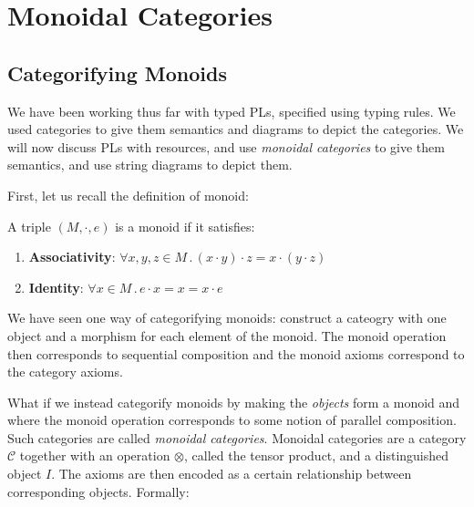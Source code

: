 \chapter{Monoidal Categories}
\section{Categorifying Monoids}

We have been working thus far with typed PLs, specified using 
typing rules. We used categories to give them semantics and 
diagrams to depict the categories. We will now discuss PLs 
with resources, and use \emph{monoidal categories} to give 
them semantics, and use string diagrams to depict them.

First, let us recall the definition of monoid:


\begin{definition}[monoid]
    A triple $(M, \cdot, e)$ is a monoid if it satisfies:
    \begin{enumerate}
        \item \textbf{Associativity}: $\forall x, y, z \in M
            \,.\, (x \cdot y) \cdot z = x \cdot (y \cdot z)$
        \item \textbf{Identity}: $\forall x \in M \,.\,
            e \cdot x = x = x \cdot e$
    \end{enumerate}
\end{definition}

We have seen one way of categorifying monoids: construct a cateogry 
with one object and a morphism for each element of the monoid.
The monoid operation then corresponds to sequential composition 
and the monoid axioms correspond to the category axioms.

What if we instead categorify monoids by making the \emph{objects} form
a monoid and where the monoid operation corresponds to some notion
of parallel composition. Such categories are called 
\emph{monoidal categories}.
Monoidal categories are a category \(\mathcal{C}\) together with an
operation \(\otimes\), called the tensor product, and a distinguished
object \(I\). The axioms are then encoded as a certain relationship
between corresponding objects. Formally:


